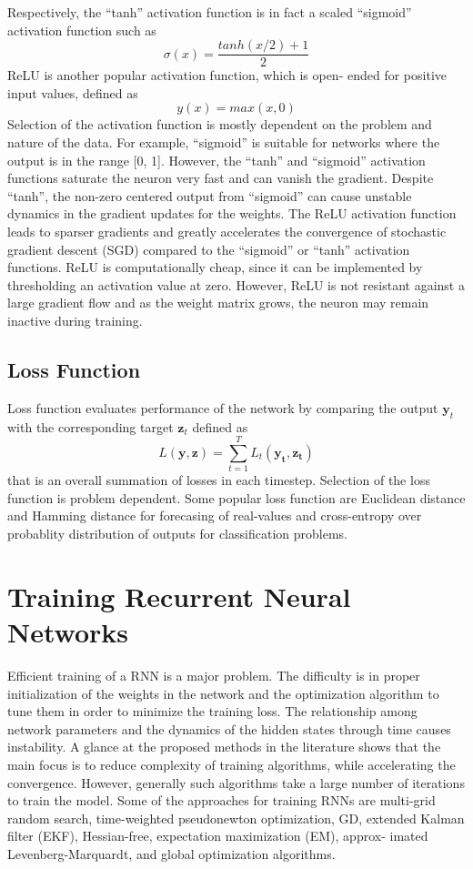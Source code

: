 \documentclass{article}
\begin{document}
Respectively, the “tanh” activation function is in fact a scaled
“sigmoid” activation function such as
\begin{equation}
  \sigma (x) = \frac{tanh(x/2)+1}{2}
\end{equation}
ReLU is another popular activation function, which is open-
ended for positive input values, defined as
\begin{equation}
  y(x) = max(x,0)
\end{equation}
Selection of the activation function is mostly dependent on
the problem and nature of the data. For example, “sigmoid”
is suitable for networks where the output is in the range
[0, 1]. However, the “tanh” and “sigmoid” activation functions
saturate the neuron very fast and can vanish the gradient.
Despite “tanh”, the non-zero centered output from “sigmoid”
can cause unstable dynamics in the gradient updates for
the weights. The ReLU activation function leads to sparser
gradients and greatly accelerates the convergence of stochastic
gradient descent (SGD) compared to the “sigmoid” or “tanh”
activation functions. ReLU is computationally cheap,
since it can be implemented by thresholding an activation
value at zero. However, ReLU is not resistant against a large
gradient flow and as the weight matrix grows, the neuron may
remain inactive during training.

\subsection{Loss Function}
Loss function evaluates performance of the network by
comparing the output $\mathbf{y}_t$ with the corresponding target $\mathbf{z}_t$
defined as
\begin{equation}
  L(\mathbf{y,z}) = \sum_{t=1}^T L_t(\mathbf{y_t, z_t})
\end{equation}
that is an overall summation of losses in each timestep.
Selection of the loss function is problem dependent. Some
popular loss function are Euclidean distance and Hamming
distance for forecasing of real-values and cross-entropy over
probablity distribution of outputs for classification problems. 
\section{Training Recurrent Neural Networks}
Efficient training of a RNN is a major problem. The
difficulty is in proper initialization of the weights in the network and the optimization algorithm to tune them in order
to minimize the training loss. The relationship among network
parameters and the dynamics of the hidden states through time
causes instability. A glance at the proposed methods in the
literature shows that the main focus is to reduce complexity
of training algorithms, while accelerating the convergence.
However, generally such algorithms take a large number of iterations to train the model. Some of the approaches for training
RNNs are multi-grid random search, time-weighted pseudonewton optimization, GD, extended Kalman filter (EKF),
Hessian-free, expectation maximization (EM), approx-
imated Levenberg-Marquardt, and global optimization
algorithms.
\end{document}
